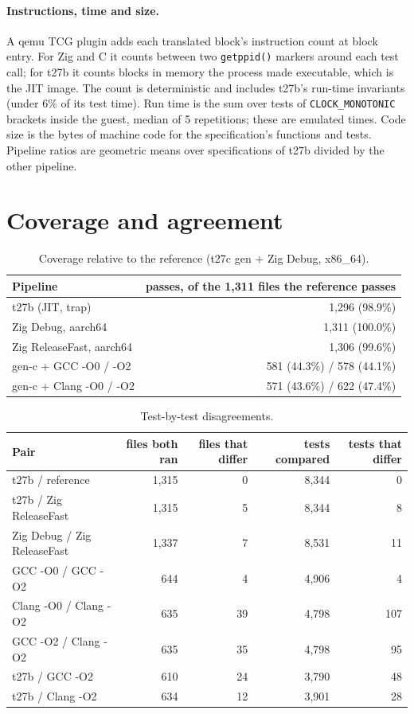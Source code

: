 \documentclass[11pt,a4paper]{article}
\begin{document}
\paragraph{Instructions, time and size.}
A qemu TCG plugin adds each translated block's instruction count at block
entry. For Zig and C it counts between two \texttt{getppid()} markers
around each test call; for t27b it counts blocks in memory the process
made executable, which is the JIT image. The count is deterministic and
includes t27b's run-time invariants (under 6\% of its test time). Run time
is the sum over tests of \texttt{CLOCK\_MONOTONIC} brackets inside the
guest, median of 5 repetitions; these are emulated times. Code size is the
bytes of machine code for the specification's functions and tests.
Pipeline ratios are geometric means over specifications of t27b divided by
the other pipeline.

\section{Coverage and agreement}
\label{sec:agree}

\begin{table}[h]
\centering
\small
\begin{tabular}{@{}lr@{}}
\toprule
Pipeline & passes, of the 1,311 files the reference passes \\
\midrule
t27b (JIT, trap) & 1,296 (98.9\%) \\
Zig Debug, aarch64 & 1,311 (100.0\%) \\
Zig ReleaseFast, aarch64 & 1,306 (99.6\%) \\
gen-c + GCC -O0 / -O2 & 581 (44.3\%) / 578 (44.1\%) \\
gen-c + Clang -O0 / -O2 & 571 (43.6\%) / 622 (47.4\%) \\
\bottomrule
\end{tabular}
\caption{Coverage relative to the reference (t27c gen + Zig Debug, x86\_64).}
\label{tab:coverage}
\end{table}

\begin{table}[h]
\centering
\small
\begin{tabular}{@{}lrrrr@{}}
\toprule
Pair & files both ran & files that differ & tests compared & tests that differ \\
\midrule
t27b / reference & 1,315 & 0 & 8,344 & 0 \\
t27b / Zig ReleaseFast & 1,315 & 5 & 8,344 & 8 \\
Zig Debug / Zig ReleaseFast & 1,337 & 7 & 8,531 & 11 \\
GCC -O0 / GCC -O2 & 644 & 4 & 4,906 & 4 \\
Clang -O0 / Clang -O2 & 635 & 39 & 4,798 & 107 \\
GCC -O2 / Clang -O2 & 635 & 35 & 4,798 & 95 \\
t27b / GCC -O2 & 610 & 24 & 3,790 & 48 \\
t27b / Clang -O2 & 634 & 12 & 3,901 & 28 \\
\bottomrule
\end{tabular}
\caption{Test-by-test disagreements.}
\label{tab:agree}
\end{table}
\end{document}
